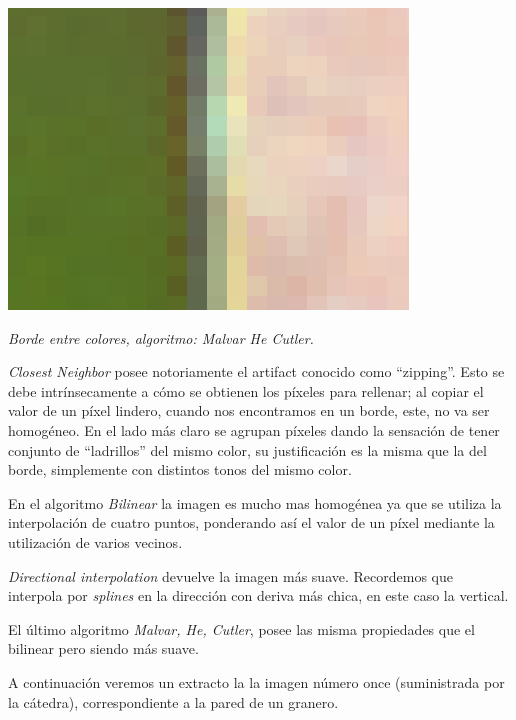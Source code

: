 	\begin{center}
		\includegraphics[scale=.5]{../enunciado/images_files/cualitativo/pico_loro_malvar.png}
		\vspace{2pt}
		\par
		\footnotesize\textit{Borde entre colores, algoritmo: Malvar He Cutler.}
	\end{center}

\vspace{\baselineskip}

 \textit{Closest Neighbor}  posee notoriamente el artifact conocido como ``zipping''. Esto se debe intrínsecamente a cómo se obtienen los píxeles para rellenar; al copiar el valor de un píxel lindero, cuando nos encontramos en un borde, este, no va ser homogéneo. En el lado más claro se agrupan píxeles dando la sensación de tener conjunto de ``ladrillos'' del mismo color, su justificación es la misma que la del borde, simplemente con distintos tonos del mismo color.

En el algoritmo \textit{Bilinear} la imagen es mucho mas homogénea ya que se utiliza la interpolación de cuatro puntos, ponderando así el valor de un píxel mediante la utilización de varios vecinos.

\textit{Directional interpolation} devuelve la imagen más suave. Recordemos que interpola por \textit{splines} en la dirección con deriva más chica, en este caso la vertical. 

El último algoritmo \textit{Malvar, He, Cutler}, posee las misma propiedades que el bilinear pero siendo más suave.

\vspace{\baselineskip}

A continuación veremos un extracto la la imagen número once (suministrada por la cátedra), correspondiente a la pared de un granero.

